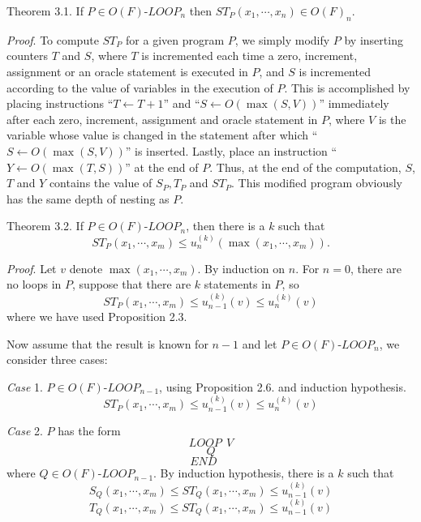 Theorem 3.1. If $P\in O(F)$-$LOOP_n$ then $ST_P(x_1,\cdots,x_n)\in
O(F)_n$.

{\it Proof}. To compute $ST_P$ for a given program $P$, we simply
modify $P$ by inserting counters $T$ and $S$, where $T$ is 
incremented each time a zero, increment, assignment or an oracle 
statement is executed in $P$, and $S$ is incremented according to 
the value of variables in the execution of $P$. This is 
accomplished by placing instructions ``$T\gets T+1$'' and 
``$S\gets O(\max(S,V))$'' immediately after each zero, increment, 
assignment and oracle statement in $P$, where $V$ is the variable 
whose value is changed in the statement after which ``$S\gets 
O(\max(S,V))$'' is inserted. Lastly, place an instruction 
``$Y\gets O(\max(T,S))$'' at the end of $P$. Thus, at the end of 
the computation, $S$, $T$ and $Y$ contains the value of $S_P,T_P$
and $ST_P$. This modified program obviously has  the same depth 
of nesting as $P$.



Theorem 3.2. If $P\in O(F)$-$LOOP_n$, then there is a $k$ such that
$$ST_P(x_1,\cdots,x_m)\le u^{(k)}_n(\max(x_1,\cdots,x_m)).$$

{\it Proof}. Let $v$ denote $\max(x_1,\cdots,x_m)$.
By induction on $n$. For $n=0$, there are no loops in $P$,
suppose that there are $k$ statements in $P$, so
$$ST_P(x_1,\cdots,x_m)\le u^{(k)}_{n-1}(v)\le u^{(k)}_n(v)$$
where we have used Proposition 2.3.

Now assume that the result is known for $n-1$ and let 
$P\in O(F)$-$LOOP_n$, we consider three cases:

{\it Case} 1. $P\in O(F)$-$LOOP_{n-1}$, using Proposition 2.6. and
induction hypothesis.
$$ST_P(x_1,\cdots,x_m)\le u^{(k)}_{n-1}(v)\le u^{(k)}_n(v)$$

{\it Case} 2. $P$ has the form
$$LOOP\ \ V$$
$$Q$$
$$END\ \ \ \ \ \ $$
where $Q\in O(F)$-$LOOP_{n-1}$. By induction hypothesis, there is a
$k$ such that
$$S_Q(x_1,\cdots,x_m)\le ST_Q(x_1,\cdots,x_m)\le u^{(k)}_{n-
1}(v)$$
$$T_Q(x_1,\cdots,x_m)\le ST_Q(x_1,\cdots,x_m)\le u^{(k)}_{n-
1}(v)$$

